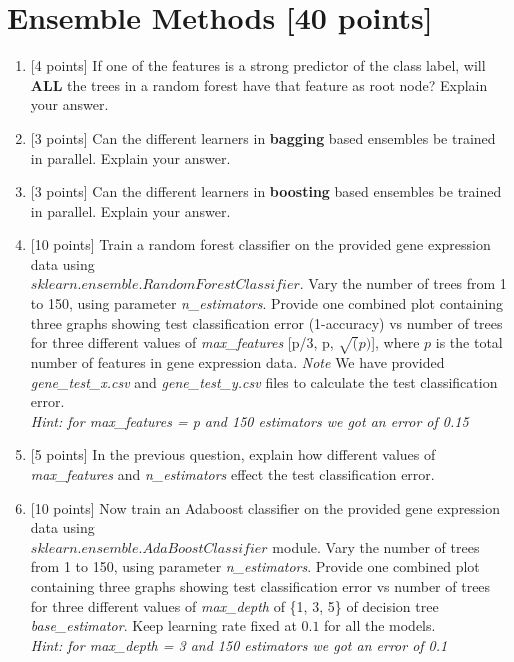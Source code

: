 \documentclass[letterpaper]{article}
\begin{document}
\section{Ensemble Methods [40 points]}
\begin{enumerate}
         \item{[4 points]} If one of the features is a strong predictor of the class label, will \textbf{ALL} the trees in a random forest have that feature as root node? Explain your answer.  
         
         
         \item{[3 points]} Can the different learners in \textbf{bagging} based ensembles be trained in parallel. Explain your answer.
         
         
         \item{[3 points]}  Can the different learners in \textbf{boosting} based ensembles  be trained in parallel. Explain your answer.
         
         
         \item{[10 points]} Train a random forest classifier on the provided gene expression data using \\ $sklearn.ensemble.RandomForestClassifier$. Vary the number of trees from 1 to 150, using parameter \textit{{n\_estimators}}. Provide one combined plot containing three graphs showing test classification error (1-accuracy) vs number of trees for three different values of \textit{max\_features} [p/3, p, $\sqrt(p)$], where $p$ is the total number of features in gene expression data.
         \textit{Note} We have provided \textit{gene\_test\_x.csv} and \textit{gene\_test\_y.csv} files to calculate the test classification error.\\
         \textit{Hint: for max\_features = p and 150 estimators we got an error of 0.15}
         
         
         
         \item{[5 points]} In the previous question, explain how different values of \textit{max\_features} and \textit{{n\_estimators}} effect the test classification error.
         
         
         \item{[10 points]} Now train an Adaboost classifier on the provided gene expression data using \\ $sklearn.ensemble.AdaBoostClassifier$ module. Vary the number of trees from 1 to 150, using parameter \textit{{n\_estimators}}. Provide one combined plot containing three graphs showing test classification error vs number of trees for three different values of \textit{max\_depth} of \{1, 3, 5\} of decision tree \textit{base\_estimator}. Keep learning rate fixed at $0.1$ for all the models.
         \\
         \textit{Hint: for max\_depth = 3 and 150 estimators we got an error of 0.1}
         

\end{enumerate}
\end{document}

